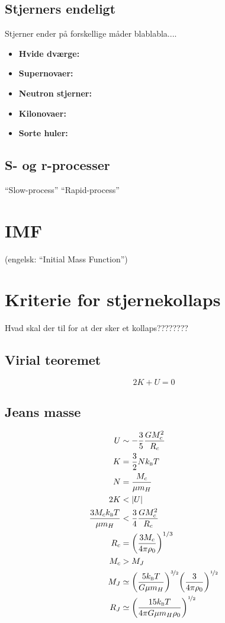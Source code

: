 \documentclass[crop=false, class=memoir]{standalone}
\begin{document}
\subsection{Stjerners endeligt}

Stjerner ender på forskellige måder blablabla....

\begin{itemize}
    \item \textbf{Hvide dværge:}
    \item \textbf{Supernovaer:}
    \item \textbf{Neutron stjerner:}
    \item \textbf{Kilonovaer:}
    \item \textbf{Sorte huler:}
\end{itemize}

\subsection{S- og r-processer}

``Slow-process'' ``Rapid-process''

\section{IMF}

(engelsk: ``Initial Mass Function'')

\section{Kriterie for stjernekollaps}

Hvad skal der til for at der sker et kollaps????????

\subsection{Virial teoremet}

\begin{equation*}
    2K + U = 0
\end{equation*}

\subsection{Jeans masse}

\begin{align*}
    U &\sim -\frac{3}{5}\frac{GM_c^2}{R_c}\\
    K &= \frac{3}{2}Nk_\textsc{b} T\\
    N &= \frac{M_c}{\mu m_H}\\
    2K &< \abs{U}\\
    \frac{3M_c k_\textsc{b} T}{\mu m_H} &< \frac{3}{4} \frac{GM_c^2}{R_c}\\
    R_c &= \qty(\frac{3M_c}{4\pi \rho_0})^{1/3}\\
    M_c &> M_J\\
    M_J &\simeq \qty(\frac{5k_\textsc{b} T}{G\mu m_H})^{\nicefrac{3}{2}}\qty(\frac{3}{4\pi\rho_0})^{\nicefrac{1}{2}}\\
    R_J &\simeq \qty(\frac{15k_\textsc{b} T}{4\pi G\mu m_H \rho_0})^{\nicefrac{1}{2}}
\end{align*}
\end{document}
